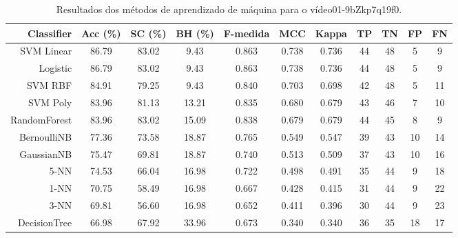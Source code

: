 \begin{table}[!htb]
\centering
\caption{Resultados dos métodos de aprendizado de máquina para o vídeo01-9bZkp7q19f0.}
\label{tab:01-9bZkp7q19f0}
\begin{tabular}{r|c|c|c|c|c|c|c|c|c|c}
\hline\hline
Classifier & Acc (\%) & SC (\%) & BH (\%) & F-medida & MCC & Kappa & TP & TN & FP & FN \\ \hline
SVM Linear & 86.79 & 83.02 & 9.43 & 0.863 & 0.738 & 0.736 & 44 & 48 & 5 & 9 \\ 
Logistic & 86.79 & 83.02 & 9.43 & 0.863 & 0.738 & 0.736 & 44 & 48 & 5 & 9 \\ 
SVM RBF & 84.91 & 79.25 & 9.43 & 0.840 & 0.703 & 0.698 & 42 & 48 & 5 & 11 \\ 
SVM Poly & 83.96 & 81.13 & 13.21 & 0.835 & 0.680 & 0.679 & 43 & 46 & 7 & 10 \\ 
RandomForest & 83.96 & 83.02 & 15.09 & 0.838 & 0.679 & 0.679 & 44 & 45 & 8 & 9 \\ 
BernoulliNB & 77.36 & 73.58 & 18.87 & 0.765 & 0.549 & 0.547 & 39 & 43 & 10 & 14 \\ 
GaussianNB & 75.47 & 69.81 & 18.87 & 0.740 & 0.513 & 0.509 & 37 & 43 & 10 & 16 \\ 
5-NN & 74.53 & 66.04 & 16.98 & 0.722 & 0.498 & 0.491 & 35 & 44 & 9 & 18 \\ 
1-NN & 70.75 & 58.49 & 16.98 & 0.667 & 0.428 & 0.415 & 31 & 44 & 9 & 22 \\ 
3-NN & 69.81 & 56.60 & 16.98 & 0.652 & 0.411 & 0.396 & 30 & 44 & 9 & 23 \\ 
DecisionTree & 66.98 & 67.92 & 33.96 & 0.673 & 0.340 & 0.340 & 36 & 35 & 18 & 17 \\ 
\hline\hline
\end{tabular}
\end{table}
